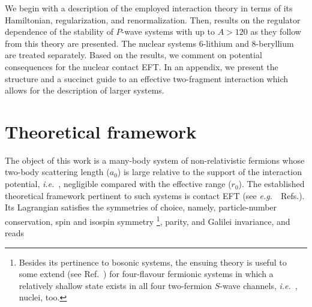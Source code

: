 \documentclass[preprint,12pt]{elsarticle}
\newcommand{\eg}{\textit{e.g.}~}
\newcommand{\ie}{\textit{i.e.}~}
\begin{document}

We begin with a description of the employed interaction theory in terms of its 
Hamiltonian, regularization, and renormalization. 
Then, results on the regulator dependence of the stability of $P$-wave systems with up to $A>120$ as they follow
from this theory are presented.
The nuclear systems 6-lithium and 8-beryllium are treated separately.
Based on the results, we comment on potential consequences for the nuclear contact EFT.
In an appendix, we present the structure and a succinct guide to an effective two-fragment interaction which
allows for the description of larger systems.

\section{Theoretical framework}


The object of this work is a many-body system of non-relativistic fermions whose two-body scattering length ($a_0$)
is large relative to the support of the interaction potential, \ie, negligible compared with the effective range ($r_0$). 
The established theoretical framework pertinent to such systems is contact EFT
(see \eg~Refs.\cite{Lepage:1997cs,vanKolck:1999mw, Bedaque:1998kg, Braaten:2004rn, Hammer:2017tjm, Hammer:2019poc}).
Its Lagrangian satisfies the symmetries of choice, namely, particle-number conservation, spin and isospin symmetry
\footnote{Besides its pertinence to bosonic systems, the ensuing theory is useful to some extend
(see Ref.~\cite{Konig:2016utl}) for four-flavour fermionic systems in which a relatively shallow state exists in all four 
two-fermion $S$-wave channels, \ie, nuclei, too.}, parity,
and Galilei invariance, and reads
\end{document}
